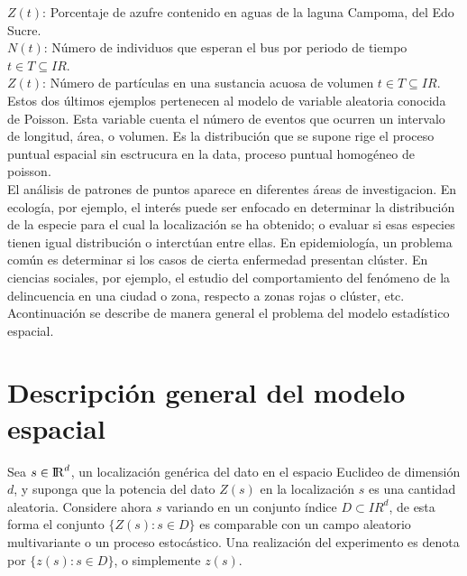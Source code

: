 \documentclass[12pt]{report}
\begin{document}
	
	$Z(t)$:  Porcentaje de azufre contenido en aguas de la laguna Campoma, del Edo Sucre. \\
	
	
	$N(t)$: Número de individuos que esperan el bus por periodo de tiempo $ t \in T \subseteq I\!R$. \\
	
	
	$ Z (t)$: Número de partículas en una sustancia acuosa de volumen  $ t \in T \subseteq I\!R$. \\
	
	Estos dos últimos ejemplos pertenecen al modelo de variable aleatoria conocida de Poisson. Esta variable  cuenta el 
	número de eventos que ocurren un intervalo de longitud, área, o volumen.  Es la distribución  que se supone rige el proceso puntual espacial sin esctrucura en la data, proceso puntual homogéneo de poisson. \\
	
	
	
	
	El análisis de patrones de puntos aparece en diferentes áreas de investigacion. En ecología, por ejemplo, el interés puede ser enfocado en determinar la distribución de la especie para el cual la localización se ha obtenido; o evaluar si esas especies tienen igual distribución o interctúan entre ellas. En epidemiología, un problema común es determinar si  los casos de cierta enfermedad presentan clúster. En ciencias sociales, por ejemplo, el estudio  del comportamiento del fenómeno de la delincuencia en una ciudad o zona, respecto a zonas rojas o clúster, etc.\\   	
	
	Acontinuación se describe de manera general el problema del modelo estadístico  espacial.
	
	
	
	
	
	
	\section{Descripción general del modelo espacial}
	
	
	
	Sea $s \in {\rm I\!R}^{d}$, un localización genérica del dato en el espacio Euclideo de dimensión $d$, y suponga que la potencia del dato $Z(s)$ en la localización $s$ es una cantidad aleatoria.  Considere ahora $s$ variando en un conjunto índice $D \subset I\!\!R^d$, de esta forma el conjunto $\{Z(s) : s \in D\}$ es comparable con un campo aleatorio multivariante o un proceso estocástico. Una realización del experimento es denota por  $\{z(s) : s \in D \}$, o simplemente $z(s)$.  \\
	
\end{document}
